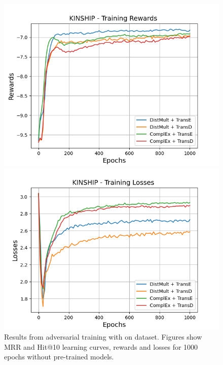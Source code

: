 \begin{figure}
    \begin{minipage}{.5\textwidth}
      \centering
      \includegraphics[width=\linewidth]{figures/results/gan_train/not_pretrained/random/kinship/1k_epochs/random_kinship_rew.png}
    \end{minipage}%
     \begin{minipage}{.5\textwidth}
      \centering
      \includegraphics[width=\linewidth]{figures/results/gan_train/not_pretrained/random/kinship/1k_epochs/random_kinship_losses.png}
    \end{minipage}%
    \caption{Results from adversarial training with \origsampling on \kinship dataset.
    Figures show MRR and Hit@10 learning curves, rewards and losses for 1000 epochs without pre-trained models.}
    \label{fig:gan_train_not_pretrained_random_kinship}
\end{figure}
